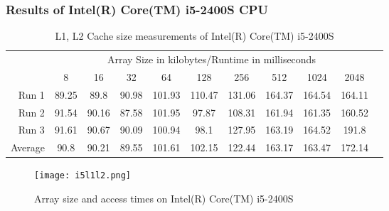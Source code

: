 \documentclass{article}
\begin{document}
\subsubsection{Results of Intel(R) Core(TM) i5-2400S CPU}
\begin{table}[H]

\begin{tabular}{r|c|c|c|c|c|c|c|c|c|c|}

\multicolumn{1}{r}{}
 &  \multicolumn{9}{c}{Array Size in kilobytes/Runtime in milliseconds} \\
\cline{2-10}
   & 8 & 16 & 32 & 64 & 128 & 256 & 512 & 1024 & 2048\\
\cline{2-10}
Run 1 & 89.25 &	89.8 & 90.98 & 101.93 & 110.47 & 131.06 & 164.37 & 164.54 & 164.11 \\
\cline{2-10}
Run 2 & 91.54 &	90.16 & 87.58 &	101.95 & 97.87 & 108.31	& 161.94 & 161.35 & 160.52 \\
\cline{2-10}
Run 3 & 91.61 & 90.67 & 90.09 &100.94 & 98.1 & 127.95 & 163.19 & 164.52 & 191.8 \\
\cline{2-10}
Average & 90.8 & 90.21 & 89.55 & 101.61 & 102.15 & 122.44 & 163.17 & 163.47 & 172.14 \\
\cline{2-10}
\end{tabular}
 \caption{L1, L2 Cache size measurements of Intel(R) Core(TM) i5-2400S}
 \label{tab:i5L1}
\end{table}

\begin{comment}
89.25 &	89.8 & 90.98 & 101.93 & 110.47 & 131.06 & 164.37 & 164.54 & 164.11
91.54 &	90.16 & 87.58 &	101.95 & 97.87 & 108.31	& 161.94 & 161.35 & 160.52
91.61 & 90.67 & 90.09 &100.94 & 98.1 & 127.95 & 163.19 & 164.52 & 191.8
90.8 & 90.21 & 89.55 & 101.61 & 102.15 & 122.44 & 163.17 & 163.47 & 172.14
\end{comment}


\begin{figure}[H]
\centering
\texttt{[image: i5l1l2.png]}
\caption{Array size and access times on Intel(R) Core(TM) i5-2400S}
\label{pic:i5l1l2}
\end{figure}	
\end{document}
